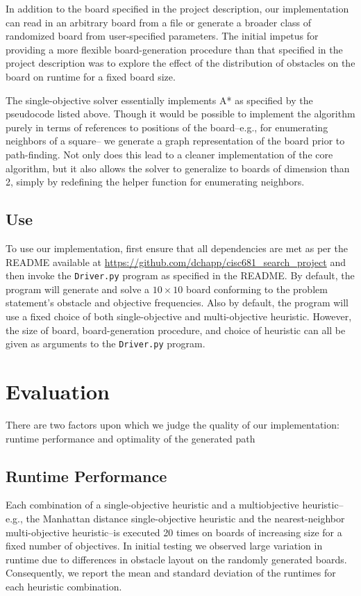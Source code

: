 \documentclass[12pt, conference, compsocconf]{IEEEtran}
\begin{document}
In addition to the board specified in the project description, our
implementation can read in an arbitrary board from a file or generate a broader
class of randomized board from user-specified parameters.  The initial impetus
for providing a more flexible board-generation procedure than that specified in
the project description was to explore the effect of the distribution of
obstacles on the board on runtime for a fixed board size.

The single-objective solver essentially implements A* as specified by the pseudocode
listed above. Though it would be possible to implement the algorithm purely in terms
of references to positions of the board--e.g., for enumerating neighbors of a square--
we generate a graph representation of the board prior to path-finding. Not only does 
this lead to a cleaner implementation of the core algorithm, but it also allows the 
solver to generalize to boards of dimension than 2, simply by redefining the helper 
function for enumerating neighbors. 

\subsection{Use}
To use our implementation, first ensure that all dependencies are met as per
the README available at \url{https://github.com/dchapp/cisc681_search_project}
and then invoke the \texttt{Driver.py} program as specified in the README.
By default, the program will generate and solve a $10 \times 10$ board conforming 
to the problem statement's obstacle and objective frequencies.  
Also by default, the program will use a fixed choice of both single-objective and
multi-objective heuristic. However, the size of board, board-generation
procedure, and choice of heuristic can all be given as arguments to the
\texttt{Driver.py} program.

\section{Evaluation}
There are two factors upon which we judge the quality of our implementation:
runtime performance and optimality of the generated path

\subsection{Runtime Performance}
Each combination of a single-objective heuristic and a multiobjective
heuristic--e.g., the Manhattan distance single-objective heuristic and the
nearest-neighbor multi-objective heuristic--is executed 20 times on boards of
increasing size for a fixed number of objectives.  In initial testing we
observed large variation in runtime due to differences in obstacle layout on
the randomly generated boards.  Consequently, we report the mean and standard
deviation of the runtimes for each heuristic combination.
\end{document}
